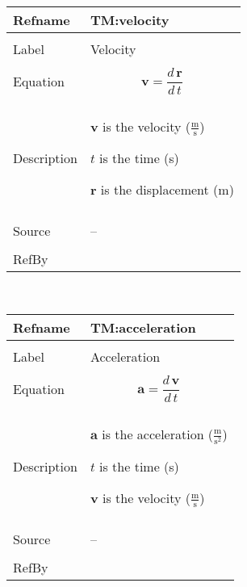 \documentclass[12pt]{article}
\begin{document}
\noindent \begin{minipage}{\textwidth}
\begin{tabular}{p{} p{}}
\toprule \textbf{Refname} & \textbf{TM:velocity}
\label{TM:velocity}
\\ \midrule \\
Label & Velocity
\\ \midrule \\
Equation & \begin{displaymath}
           \mathbf{v}=\frac{d\,\mathbf{r}}{d\,t}
           \end{displaymath}
\\ \midrule \\
Description & \begin{symbDescription}
              \item{$\mathbf{v}$ is the velocity ($\frac{\text{m}}{\text{s}}$)}
              \item{$t$ is the time (s)}
              \item{$\mathbf{r}$ is the displacement (m)}
              \end{symbDescription}
\\ \midrule \\
Source & --
\\ \midrule \\
RefBy & 
\\ \bottomrule \end{tabular}
\end{minipage}
\par~

\noindent \begin{minipage}{\textwidth}
\begin{tabular}{p{} p{}}
\toprule \textbf{Refname} & \textbf{TM:acceleration}
\label{TM:acceleration}
\\ \midrule \\
Label & Acceleration
\\ \midrule \\
Equation & \begin{displaymath}
           \mathbf{a}=\frac{d\,\mathbf{v}}{d\,t}
           \end{displaymath}
\\ \midrule \\
Description & \begin{symbDescription}
              \item{$\mathbf{a}$ is the acceleration ($\frac{\text{m}}{\text{s}^{2}}$)}
              \item{$t$ is the time (s)}
              \item{$\mathbf{v}$ is the velocity ($\frac{\text{m}}{\text{s}}$)}
              \end{symbDescription}
\\ \midrule \\
Source & --
\\ \midrule \\
RefBy & 
\\ \bottomrule \end{tabular}
\end{minipage}
\end{document}
